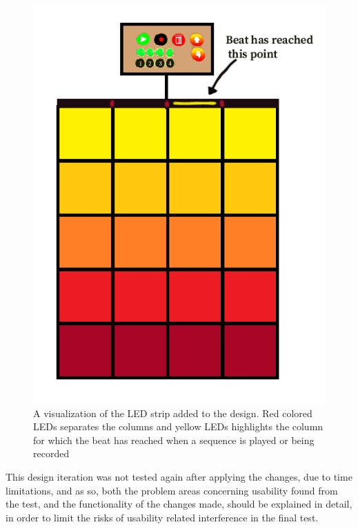 \begin{figure}[H]
	\centering
	\includegraphics[width=0.7\linewidth]{figure/Design/LEDstrip}
	\caption{A visualization of the LED strip added to the design. Red colored LEDs separates the columns and yellow LEDs highlights the column for which the beat has reached when a sequence is played or being recorded}
	\label{fig:LEDstrip}
\end{figure}

This design iteration was not tested again after applying the changes, due to time limitations, and as so, both the problem areas concerning usability found from the test, and the functionality of the changes made, should be explained in detail, in order to limit the risks of usability related interference in the final test.
